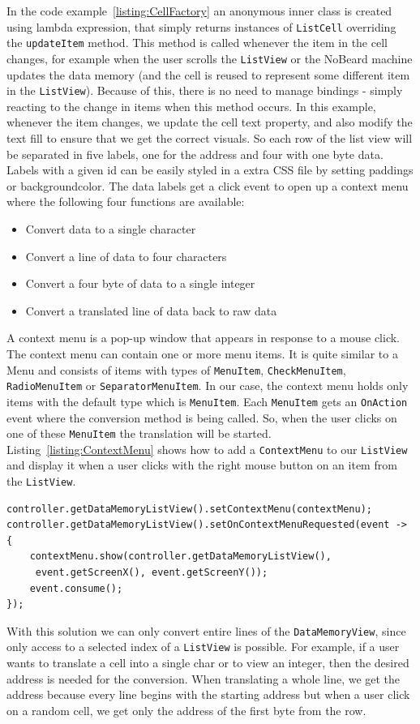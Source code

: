 In the code example~\ref{listing:CellFactory} an anonymous inner class is created using lambda expression, that simply returns instances of \lstinline$ListCell$ overriding the \lstinline$updateItem$ method. This method is called whenever the item in the cell changes, for example when the user scrolls the \lstinline$ListView$ or the NoBeard machine updates the data memory (and the cell is reused to represent some different item in the \lstinline$ListView$). Because of this, there is no need to manage bindings - simply reacting to the change in items when this method occurs. In this example, whenever the item changes, we update the cell text property, and also modify the text fill to ensure that we get the correct visuals.
So each row of the list view will be separated in five labels, one for the address and four with one byte data. Labels with a given id can be easily styled in a extra CSS file by setting paddings or backgroundcolor. The data labels get a click event to open up a context menu where the following four functions are available:
\begin{itemize}
\item Convert data to a single character
\item Convert a line of data to four characters
\item Convert a four byte of data to a single integer
\item Convert a translated line of data back to raw data
\end{itemize}
A context menu is a pop-up window that appears in response to a mouse click. The context menu can contain one or more menu items. It is quite similar to a Menu and consists of items with types of \lstinline$MenuItem$, \lstinline$CheckMenuItem$, \lstinline$RadioMenuItem$ or \lstinline$SeparatorMenuItem$. In our case, the context menu holds only items with the default type which is \lstinline$MenuItem$. Each \lstinline$MenuItem$ gets an \lstinline$OnAction$ event where the conversion method is being called. So, when the user clicks on one of these \lstinline$MenuItem$ the translation will be started.
Listing~\ref{listing:ContextMenu} shows how to add a \lstinline$ContextMenu$ to our \lstinline$ListView$ and display it when a user clicks with the right mouse button on an item from the \lstinline$ListView$. 

\begin{lstlisting}[caption={Context menu},label=listing:ContextMenu]
controller.getDataMemoryListView().setContextMenu(contextMenu);
controller.getDataMemoryListView().setOnContextMenuRequested(event -> {
    contextMenu.show(controller.getDataMemoryListView(),
     event.getScreenX(), event.getScreenY());
    event.consume();
});
\end{lstlisting}
With this solution we can only convert entire lines of the \lstinline$DataMemoryView$, since only access to a selected index of a \lstinline$ListView$ is possible. For example, if a user wants to translate a cell into a single char or to view an integer, then the desired address is needed for the conversion. When translating a whole line, we get the address because every line begins with the starting address but when a user click on a random cell, we get only the address of the first byte from the row. 

